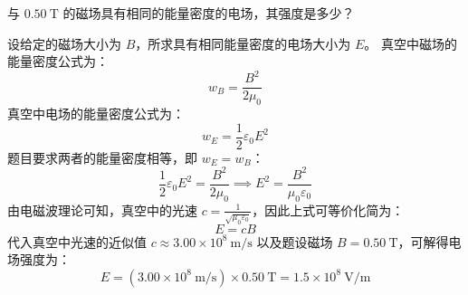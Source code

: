 \begin{exercise}\label{ex:20.6}
与 $0.50 \ \mathrm{T}$ 的磁场具有相同的能量密度的电场，其强度是多少？
\end{exercise}
\begin{solution}
设给定的磁场大小为 $B$，所求具有相同能量密度的电场大小为 $E$。
真空中磁场的能量密度公式为：
$$ w_B = \frac{B^2}{2\mu_0} $$
真空中电场的能量密度公式为：
$$ w_E = \frac{1}{2} \varepsilon_0 E^2 $$
题目要求两者的能量密度相等，即 $w_E = w_B$：
$$ \frac{1}{2} \varepsilon_0 E^2 = \frac{B^2}{2\mu_0} \implies E^2 = \frac{B^2}{\mu_0 \varepsilon_0} $$
由电磁波理论可知，真空中的光速 $c = \frac{1}{\sqrt{\mu_0 \varepsilon_0}}$，因此上式可等价化简为：
$$ E = c B $$
代入真空中光速的近似值 $c \approx 3.00 \times 10^8 \ \mathrm{m/s}$ 以及题设磁场 $B = 0.50 \ \mathrm{T}$，可解得电场强度为：
$$ E = (3.00 \times 10^8 \ \mathrm{m/s}) \times 0.50 \ \mathrm{T} = 1.5 \times 10^8 \ \mathrm{V/m} $$
\end{solution}

